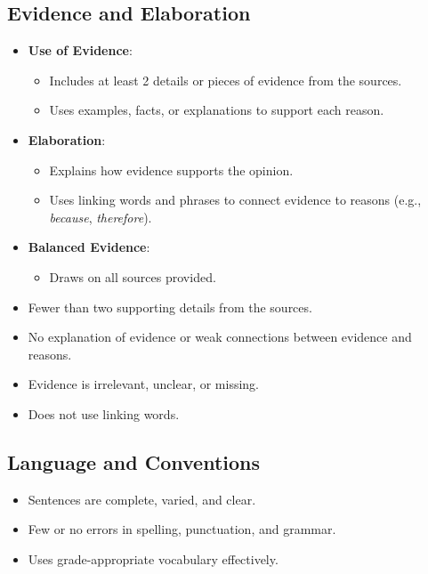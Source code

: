 \documentclass[12pt]{article}
\begin{document}
\subsection*{Evidence and Elaboration}
\begin{tcolorbox}[colframe=black!60, colback=white, title=Pass Criteria]
\begin{itemize}
    \item \textbf{Use of Evidence}:
    \begin{itemize}
        \item Includes at least 2 details or pieces of evidence from the sources.
        \item Uses examples, facts, or explanations to support each reason.
    \end{itemize}
    \item \textbf{Elaboration}:
    \begin{itemize}
        \item Explains how evidence supports the opinion.
        \item Uses linking words and phrases to connect evidence to reasons (e.g., \textit{because}, \textit{therefore}).
    \end{itemize}
    \item \textbf{Balanced Evidence}:
    \begin{itemize}
        \item Draws on all sources provided.
    \end{itemize}
\end{itemize}
\end{tcolorbox}

\begin{tcolorbox}[colframe=black!60, colback=white, title=Fail Criteria]
\begin{itemize}
    \item Fewer than two supporting details from the sources.
    \item No explanation of evidence or weak connections between evidence and reasons.
    \item Evidence is irrelevant, unclear, or missing.
    \item Does not use linking words.
\end{itemize}
\end{tcolorbox}

\subsection*{Language and Conventions}
\begin{tcolorbox}[colframe=black!60, colback=white, title=Pass Criteria]
\begin{itemize}
    \item Sentences are complete, varied, and clear.
    \item Few or no errors in spelling, punctuation, and grammar.
    \item Uses grade-appropriate vocabulary effectively.
\end{itemize}
\end{tcolorbox}
\end{document}
